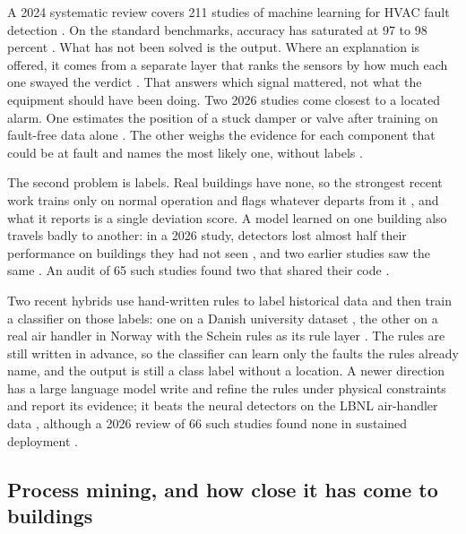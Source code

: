 \documentclass[conference]{IEEEtran}
\begin{document}
A 2024 systematic review covers 211 studies of machine learning for HVAC fault detection \cite{bi2024aihvacreview}. On the standard benchmarks, accuracy has saturated at 97 to 98 percent \cite{tun2021hybridrfsvm,prince2025improved1dcnnlstm}. What has not been solved is the output. Where an explanation is offered, it comes from a separate layer that ranks the sensors by how much each one swayed the verdict \cite{deng2024afgcn,li2024interpretablegnn,wang2025xmhac}. That answers which signal mattered, not what the equipment should have been doing. Two 2026 studies come closest to a located alarm. One estimates the position of a stuck damper or valve after training on fault-free data alone \cite{park2026koopman}. The other weighs the evidence for each component that could be at fault and names the most likely one, without labels \cite{paolini2026bayesian}.

The second problem is labels. Real buildings have none, so the strongest recent work trains only on normal operation and flags whatever departs from it \cite{abdollah2024transformerssl,elmokhtari2024aebas}, and what it reports is a single deviation score. A model learned on one building also travels badly to another: in a 2026 study, detectors lost almost half their performance on buildings they had not seen \cite{jiang2026crossdomain}, and two earlier studies saw the same \cite{zhu2021chillertransfer,ghalamsiah2025canhvac}. An audit of 65 such studies found two that shared their code \cite{mukhtar2025reproducibility}.

Two recent hybrids use hand-written rules to label historical data and then train a classifier on those labels: one on a Danish university dataset \cite{mazzetto2025danishbas}, the other on a real air handler in Norway with the Schein rules as its rule layer \cite{zabadi2026digitaltwinapar}. The rules are still written in advance, so the classifier can learn only the faults the rules already name, and the output is still a class label without a location. A newer direction has a large language model write and refine the rules under physical constraints and report its evidence; it beats the neural detectors on the LBNL air-handler data \cite{linhua2025pillm}, although a 2026 review of 66 such studies found none in sustained deployment \cite{neubauer2026llmreview}.

\subsection{Process mining, and how close it has come to buildings}
\label{sec:pmrelated}
\end{document}
